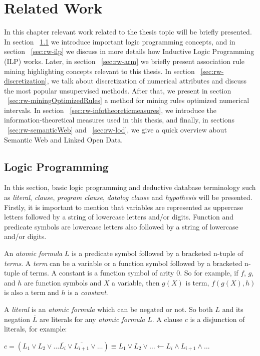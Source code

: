 \chapter{Related Work}
\label{sec:rw-intro}

In this chapter relevant work related to the thesis topic will be briefly presented. In section 
~\ref{sec:rw-lp} we introduce important logic programming concepts, and in section ~\ref{sec:rw-ilp} we discuss in
more details how Inductive Logic Programming (ILP) works. Later, in section ~\ref{sec:rw-arm} we briefly present
association rule mining highlighting concepts relevant to this thesis. In section ~\ref{sec:rw-discretization}, we
talk about discretization of numerical attributes and discuss the most popular unsupervised methods. After that, we
present in section ~\ref{sec:rw-miningOptimizedRules} a method for mining rules optimized numerical intervals. In
section ~\ref{sec:rw-infotheoreticmeasures}, we introduce the information-theoretical measures used in this thesis,
and finally, in sections ~\ref{sec:rw-semanticWeb} and ~\ref{sec:rw-lod}, we give a quick overview about Semantic Web
and Linked Open Data.


\section{Logic Programming}
\label{sec:rw-lp}

\cite{DBLP:books/sp/Lloyd87}
\cite{DBLP:journals/ml/LavracD96}
In this section, basic logic programming and deductive database terminology such as \emph{literal}, \emph{clause},
\emph{program clause}, \emph{datalog clause} and \emph{hypothesis} will be presented. Firstly, it is important to
mention that variables are represented as uppercase letters followed by a string of lowercase letters and/or digits.
Function and predicate symbols are lowercase letters also followed by a string of lowercase and/or digits.

An \emph{atomic formula} $L$ is a predicate symbol followed by a bracketed n-tuple of \emph{terms}. A \emph{term} can
be
a variable or a function symbol followed by a bracketed n-tuple of terms. A constant is a function symbol of arity 0.
So
for example, if $f$, $g$, and $h$ are function symbols and $X$ a variable, then $g(X)$ is term, $f(g(X),h)$ is also a
term and $h$ is a \emph{constant}.

A \emph{literal} is an \emph{atomic formula} which can be negated or not. So both $L$ and its negation $\overline{L}$
are literals for any \emph{atomic formula} $L$. A clause $c$ is a disjunction of literals, for example:
\begin{center}
  $c=(L_1 \vee L_2 \vee \ldots \overline{L_{i}} \vee \overline{L_{i+1}} \vee \ldots) \equiv
 L_1 \vee L_2 \vee \ldots \leftarrow L_i \wedge L_{i+1} \wedge \ldots$
\end{center}

